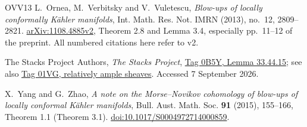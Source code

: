 \documentclass[12pt]{amsart}
\theoremstyle{definition}
\theoremstyle{remark}
\numberwithin{equation}{section}
\begin{document}
\begin{thebibliography}{OVV13}
L.~Ornea, M.~Verbitsky and V.~Vuletescu, \emph{Blow-ups of locally conformally K\"ahler manifolds}, Int. Math. Res. Not. IMRN (2013), no.~12, 2809--2821.
\href{https://arxiv.org/abs/1108.4885}{arXiv:1108.4885v2}, Theorem 2.8 and Lemma 3.4, especially pp.~11--12 of the preprint. All numbered citations here refer to v2.

The Stacks Project Authors, \emph{The Stacks Project},
\href{https://stacks.math.columbia.edu/tag/0B5Y}{Tag 0B5Y, Lemma 33.44.15}; see also
\href{https://stacks.math.columbia.edu/tag/01VG}{Tag 01VG, relatively ample sheaves}. Accessed 7 September 2026.

X.~Yang and G.~Zhao, \emph{A note on the Morse--Novikov cohomology of blow-ups of locally conformal K\"ahler manifolds}, Bull. Aust. Math. Soc. \textbf{91} (2015), 155--166, Theorem 1.1 (Theorem 3.1).
\href{https://doi.org/10.1017/S0004972714000859}{doi:10.1017/S0004972714000859}.
\end{thebibliography}

\clearpage
\endgroup
\end{document}
